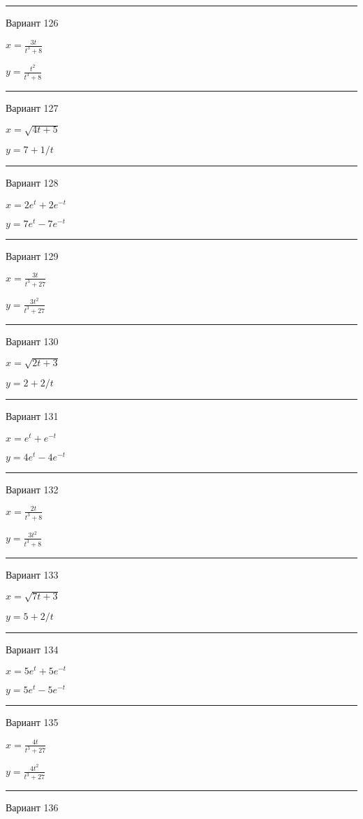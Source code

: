 \documentclass[11pt]{report}
\begin{document}
\rule{\textwidth}{.2mm}

 Вариант 126

$x = \frac{3 t}{t^{3} + 8}$

$y = \frac{t^{2}}{t^{3} + 8}$

\rule{\textwidth}{.2mm}

 Вариант 127

$x = \sqrt{4 t + 5}$

$y = 7 + 1 / t$

\rule{\textwidth}{.2mm}

 Вариант 128

$x = 2 e^{t} + 2 e^{- t}$

$y = 7 e^{t} - 7 e^{- t}$

\rule{\textwidth}{.2mm}

 Вариант 129

$x = \frac{3 t}{t^{3} + 27}$

$y = \frac{3 t^{2}}{t^{3} + 27}$

\rule{\textwidth}{.2mm}

 Вариант 130

$x = \sqrt{2 t + 3}$

$y = 2 + 2 / t$

\rule{\textwidth}{.2mm}

 Вариант 131

$x = e^{t} + e^{- t}$

$y = 4 e^{t} - 4 e^{- t}$

\rule{\textwidth}{.2mm}

 Вариант 132

$x = \frac{2 t}{t^{3} + 8}$

$y = \frac{3 t^{2}}{t^{3} + 8}$

\rule{\textwidth}{.2mm}

 Вариант 133

$x = \sqrt{7 t + 3}$

$y = 5 + 2 / t$

\rule{\textwidth}{.2mm}

 Вариант 134

$x = 5 e^{t} + 5 e^{- t}$

$y = 5 e^{t} - 5 e^{- t}$

\rule{\textwidth}{.2mm}

 Вариант 135

$x = \frac{4 t}{t^{3} + 27}$

$y = \frac{4 t^{2}}{t^{3} + 27}$

\rule{\textwidth}{.2mm}

 Вариант 136
\end{document}
